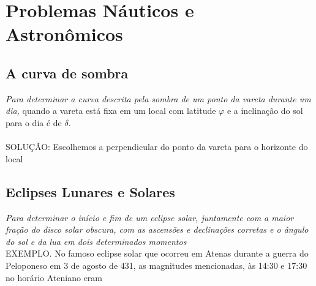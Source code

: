 \chapter{Problemas Náuticos e Astronômicos}
\section{A curva de sombra}
\textit{Para determinar a curva descrita pela sombra de um ponto da vareta durante um dia,} quando a vareta está fixa em um local com latitude $\varphi$ e a inclinação do sol para o dia é de $\delta.$\\\\
SOLUÇÃO: Escolhemos a perpendicular do ponto da vareta para o horizonte do local 

\section{Eclipses Lunares e Solares}
\textit{Para determinar o início e fim de um eclipse solar, juntamente com a maior fração do disco solar obscura, com as ascensões e declinações corretas e o ângulo do sol e da lua em dois determinados momentos} \\
EXEMPLO. No famoso eclipse solar que ocorreu em Atenas durante a guerra do Peloponeso em 3 de agosto de 431, as magnitudes mencionadas, às 14:30 e 17:30 no horário Ateniano eram\\


